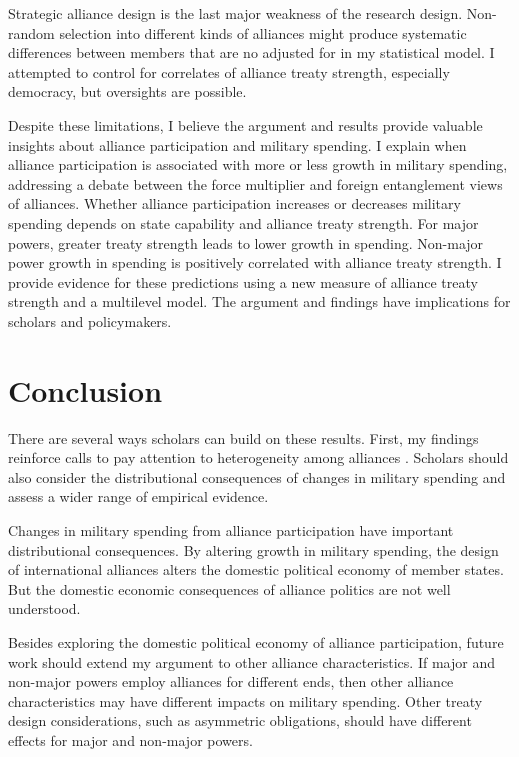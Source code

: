 \documentclass[12pt]{article}
\begin{document}
Strategic alliance design is the last major weakness of the research design. 
Non-random selection into different kinds of alliances might produce systematic differences between members that are no adjusted for in my statistical model. 
I attempted to control for correlates of alliance treaty strength, especially democracy, but oversights are possible. 


Despite these limitations, I believe the argument and results provide valuable insights about alliance participation and military spending. 
I explain when alliance participation is associated with more or less growth in military spending, addressing a debate between the force multiplier and foreign entanglement views of alliances. 
Whether alliance participation increases or decreases military spending depends on state capability and alliance treaty strength. 
For major powers, greater treaty strength leads to lower growth in spending. 
Non-major power growth in spending is positively correlated with alliance treaty strength. 
I provide evidence for these predictions using a new measure of alliance treaty strength and a multilevel model. 
The argument and findings have implications for scholars and policymakers. 



\section{Conclusion}


There are several ways scholars can build on these results. 
First, my findings reinforce calls to pay attention to heterogeneity among alliances \citep{Leeds2003, DigiuseppePoast2016}.
Scholars should also consider the distributional consequences of changes in military spending and assess a wider range of empirical evidence. 


Changes in military spending from alliance participation have important distributional consequences. 
By altering growth in military spending, the design of international alliances alters the domestic political economy of member states. 
But the domestic economic consequences of alliance politics are not well understood. 


Besides exploring the domestic political economy of alliance participation, future work should extend my argument to other alliance characteristics. 
If major and non-major powers employ alliances for different ends, then other alliance characteristics may have different impacts on military spending. 
Other treaty design considerations, such as asymmetric obligations, should have different effects for major and non-major powers. 
\end{document}
